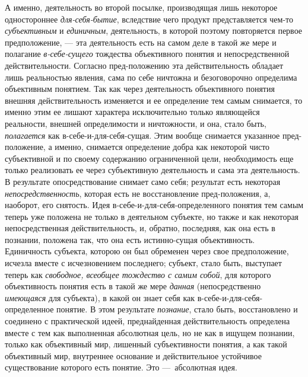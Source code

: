 \documentclass[twoside]{article}
\begin{document}
А именно, деятельность во второй посылке, производящая лишь
некоторое одностороннее
{\em для-себя-бытие},
вследствие чего продукт представляется чем-то
{\em субъективным} и
{\em единичным},
деятельность, в которой поэтому повторяется первое
предположение, — эта деятельность есть на самом деле в такой
же мере и полагание {\em в-себе-сущего}
тождества объективного понятия и непосредственной
действительности. Согласно пред-положению эта действительность
обладает лишь реальностью явления, сама по себе ничтожна и безоговорочно
определима объективным понятием. Так как через деятельность объективного
понятия внешняя действительность изменяется и ее определение тем самым
снимается, то именно этим ее лишают характера исключительно только
являющейся реальности, внешней определимости и ничтожности, и она, стало
быть, {\em полагается}
как в-себе-и-для-себя-сущая. Этим вообще снимается указанное
пред-положение, а именно, снимается определение добра как некоторой чисто
субъективной и по своему содержанию ограниченной цели, необходимость еще
только реализовать ее через субъективную деятельность и сама эта
деятельность. В результате опосредствование снимает само себя; результат
есть некоторая
{\em непосредственность},
которая есть не восстановление пред-положения, а, наоборот,
его снятость. Идея в-себе-и-для-себя-определенного понятия тем самым теперь
уже положена не только в деятельном субъекте, но также и как некоторая
непосредственная действительность, и, обратно, последняя, как она есть в
познании, положена так, что она есть истинно-сущая объективность.
Единичность субъекта, которою он был обременен через свое предположение,
исчезла вместе с исчезновением последнего; субъект, стало быть, выступает
теперь как {\em свободное, всеобщее
тождество с самим собой}, для которого объективность понятия
есть в такой же мере {\em данная}
(непосредственно
{\em имеющаяся} для
субъекта), в какой он знает себя как в-себе-и-для-себя-определенное
понятие. В этом результате
{\em познание}, стало
быть, восстановлено и соединено с практической идеей,
преднайденная действительность определена вместе с тем как выполненная
абсолютная цель, но не как в ищущем познании, только как объективный мир,
лишенный субъективности понятия, а как такой объективный мир, внутреннее
основание и действительное устойчивое существование которого есть понятие.
Это —~абсолютная идея.
\end{document}
